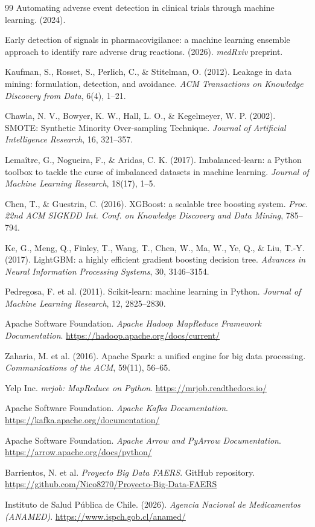 \documentclass[12pt,a4paper]{article}
\begin{document}
\begin{thebibliography}{99}
Automating adverse event detection in clinical trials through machine learning. (2024).

Early detection of signals in pharmacovigilance: a machine learning ensemble approach to identify rare adverse drug reactions. (2026). \textit{medRxiv} preprint.

Kaufman, S., Rosset, S., Perlich, C., \& Stitelman, O. (2012). Leakage in data mining: formulation, detection, and avoidance. \textit{ACM Transactions on Knowledge Discovery from Data}, 6(4), 1--21.

Chawla, N. V., Bowyer, K. W., Hall, L. O., \& Kegelmeyer, W. P. (2002). SMOTE: Synthetic Minority Over-sampling Technique. \textit{Journal of Artificial Intelligence Research}, 16, 321--357.

Lema\^itre, G., Nogueira, F., \& Aridas, C. K. (2017). Imbalanced-learn: a Python toolbox to tackle the curse of imbalanced datasets in machine learning. \textit{Journal of Machine Learning Research}, 18(17), 1--5.

Chen, T., \& Guestrin, C. (2016). XGBoost: a scalable tree boosting system. \textit{Proc. 22nd ACM SIGKDD Int. Conf. on Knowledge Discovery and Data Mining}, 785--794.

Ke, G., Meng, Q., Finley, T., Wang, T., Chen, W., Ma, W., Ye, Q., \& Liu, T.-Y. (2017). LightGBM: a highly efficient gradient boosting decision tree. \textit{Advances in Neural Information Processing Systems}, 30, 3146--3154.

Pedregosa, F. et al. (2011). Scikit-learn: machine learning in Python. \textit{Journal of Machine Learning Research}, 12, 2825--2830.

Apache Software Foundation. \textit{Apache Hadoop MapReduce Framework Documentation}. \url{https://hadoop.apache.org/docs/current/}

Zaharia, M. et al. (2016). Apache Spark: a unified engine for big data processing. \textit{Communications of the ACM}, 59(11), 56--65.

Yelp Inc. \textit{mrjob: MapReduce on Python}. \url{https://mrjob.readthedocs.io/}

Apache Software Foundation. \textit{Apache Kafka Documentation}. \url{https://kafka.apache.org/documentation/}

Apache Software Foundation. \textit{Apache Arrow and PyArrow Documentation}. \url{https://arrow.apache.org/docs/python/}

Barrientos, N. et al. \textit{Proyecto Big Data FAERS}. GitHub repository. \url{https://github.com/Nico8270/Proyecto-Big-Data-FAERS}

Instituto de Salud Pública de Chile. (2026). \textit{Agencia Nacional de Medicamentos (ANAMED)}. \url{https://www.ispch.gob.cl/anamed/}

\end{thebibliography}
\end{document}
